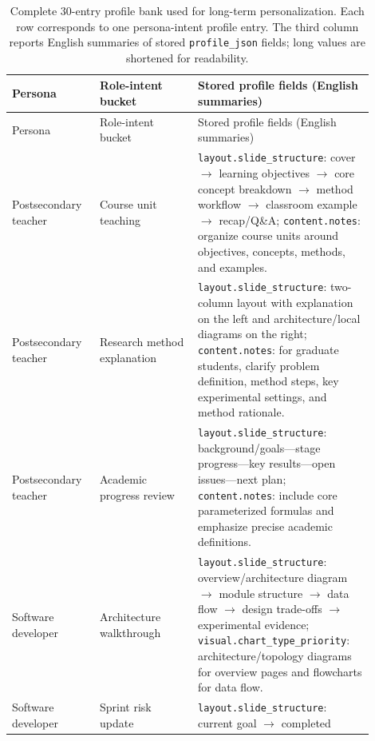\documentclass{llmxive}
\providecommand{\arraystretch}{1.0}
\begin{document}
\begingroup
\small
\setlength{\tabcolsep}{2.4pt}
\renewcommand{\arraystretch}{1.05}
\setlength{\LTleft}{0pt}
\setlength{\LTright}{0pt}
\setlength{\LTcapwidth}{\textwidth}
\begin{longtable}{>{\scriptsize\arraybackslash}p{0.22\linewidth}
                  >{\scriptsize\arraybackslash}p{0.25\linewidth}
                  >{\scriptsize\arraybackslash}p{0.43\linewidth}}
\caption{Complete 30-entry profile bank used for long-term
personalization. Each row corresponds to one persona-intent profile entry. The
third column reports English summaries of stored \texttt{profile\_json} fields;
long values are shortened for readability.}
\label{tab:appendix_profile_library_catalog}\\
\toprule
Persona & Role-intent bucket & Stored profile fields (English summaries) \\
\midrule
\endfirsthead
\toprule
Persona & Role-intent bucket & Stored profile fields (English summaries) \\
\midrule
\endhead
\bottomrule
\endfoot
Postsecondary teacher & Course unit teaching &
\texttt{layout.slide\_structure}: cover $\rightarrow$ learning objectives
$\rightarrow$ core concept breakdown $\rightarrow$ method workflow
$\rightarrow$ classroom example $\rightarrow$ recap/Q\&A;
\texttt{content.notes}: organize course units around objectives, concepts,
methods, and examples. \\
Postsecondary teacher & Research method explanation &
\texttt{layout.slide\_structure}: two-column layout with explanation on the
left and architecture/local diagrams on the right;
\texttt{content.notes}: for graduate students, clarify problem definition,
method steps, key experimental settings, and method rationale. \\
Postsecondary teacher & Academic progress review &
\texttt{layout.slide\_structure}: background/goals---stage progress---key
results---open issues---next plan;
\texttt{content.notes}: include core parameterized formulas and emphasize
precise academic definitions. \\
\midrule
Software developer & Architecture walkthrough &
\texttt{layout.slide\_structure}: overview/architecture diagram
$\rightarrow$ module structure $\rightarrow$ data flow $\rightarrow$ design
trade-offs $\rightarrow$ experimental evidence;
\texttt{visual.chart\_type\_priority}: architecture/topology diagrams for
overview pages and flowcharts for data flow. \\
Software developer & Sprint risk update &
\texttt{layout.slide\_structure}: current goal $\rightarrow$ completed

\end{longtable}
\end{document}
